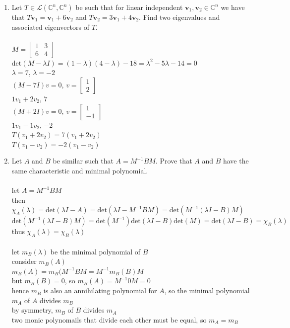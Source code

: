 \documentclass{article}
\begin{document}
{{\begin{enumerate}
\newpage\item Let $T\in\mathcal{L}(\mathbb{C}^n,\mathbb{C}^n)$ be such that for linear independent $\bm{v}_1,\bm{v}_2\in\mathbb{C}^n$ we have that $T\bm{v}_1=\bm{v}_1+6\bm{v}_2$ and $T\bm{v}_2=3\bm{v}_1+4\bm{v}_2$. Find two eigenvalues and associated eigenvectors of $T$.
\\
\\$M=\left[\begin{array}{cc}1&3\\6&4\end{array}\right]$
\\$\textrm{det}(M-\lambda I)=(1-\lambda)(4-\lambda)-18=\lambda^2-5\lambda-14=0$
\\$\lambda=7$, $\lambda=-2$
\\$(M-7I)v=0$, $v=\left[\begin{array}{c}1\\2\end{array}\right]$
\\$1v_1+2v_2$, $7$
\\$(M+2I)v=0$, $v=\left[\begin{array}{c}1\\-1\end{array}\right]$
\\$1v_1-1v_2$, $-2$
\\$T(v_1+2v_2)=7(v_1+2v_2)$
\\$T(v_1-v_2)=-2(v_1-v_2)$


\newpage\item Let $A$ and $B$ be similar such that $A=M^{-1}BM$. Prove that $A$ and $B$ have the same characteristic and minimal polynomial. 
\\
\\let $A=M^{-1}BM$
\\then $\chi_A(\lambda)=\textrm{det}(\lambda I-A)=\textrm{det}(\lambda I-M^{-1}BM)=\textrm{det}(M^{-1}(\lambda I-B)M)$
\\$\textrm{det}(M^{-1}(\lambda I-B)M)=\textrm{det}(M^{-1})\textrm{det}(\lambda I-B)\textrm{det}(M)=\textrm{det}(\lambda I-B)=\chi_B(\lambda)$
\\thus $\chi_A(\lambda)=\chi_B(\lambda)$
\\
\\let $m_B(\lambda)$ be the minimal polynomial of $B$
\\consider $m_B(A)$
\\$m_B(A)=m_B(M^{-1}BM=M^{-1}m_B(B)M$
\\but $m_B(B)=0$, so $m_B(A)=M^{-1}0M=0$
\\hence $m_B$ is also an annihilating polynomial for $A$, so the minimal polynomial $m_A$ of $A$ divides $m_B$
\\by symmetry, $m_B$ of $B$ divides $m_A$
\\two monic polynomails that divide each other must be equal, so $m_A=m_B$



\end{enumerate}}}
\end{document}
